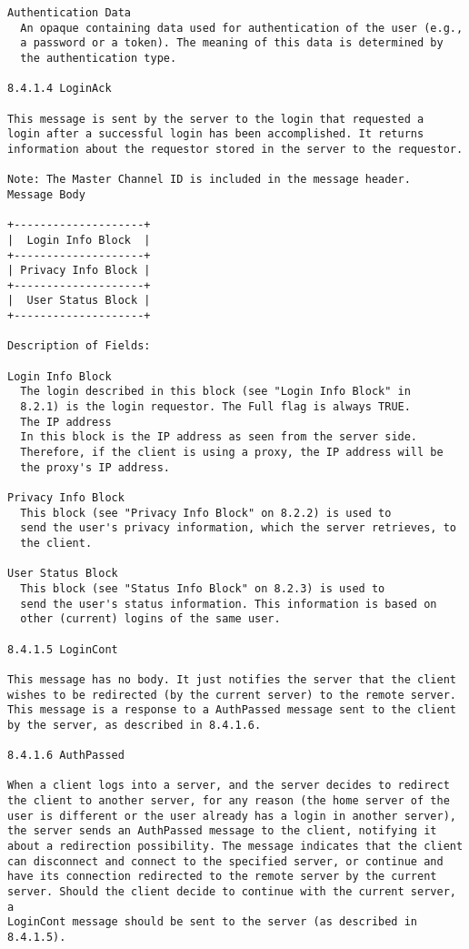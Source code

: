 \documentclass[titlepage,oneside]{book}
\begin{document}
\begin{verbatim}
Authentication Data
  An opaque containing data used for authentication of the user (e.g.,
  a password or a token). The meaning of this data is determined by
  the authentication type.

8.4.1.4 LoginAck

This message is sent by the server to the login that requested a
login after a successful login has been accomplished. It returns
information about the requestor stored in the server to the requestor.

Note: The Master Channel ID is included in the message header.
Message Body

+--------------------+
|  Login Info Block  |
+--------------------+
| Privacy Info Block |
+--------------------+
|  User Status Block |
+--------------------+

Description of Fields:

Login Info Block
  The login described in this block (see "Login Info Block" in
  8.2.1) is the login requestor. The Full flag is always TRUE.
  The IP address
  In this block is the IP address as seen from the server side.
  Therefore, if the client is using a proxy, the IP address will be
  the proxy's IP address.

Privacy Info Block
  This block (see "Privacy Info Block" on 8.2.2) is used to
  send the user's privacy information, which the server retrieves, to
  the client.

User Status Block
  This block (see "Status Info Block" on 8.2.3) is used to
  send the user's status information. This information is based on
  other (current) logins of the same user.

8.4.1.5 LoginCont

This message has no body. It just notifies the server that the client
wishes to be redirected (by the current server) to the remote server.
This message is a response to a AuthPassed message sent to the client
by the server, as described in 8.4.1.6.

8.4.1.6 AuthPassed

When a client logs into a server, and the server decides to redirect
the client to another server, for any reason (the home server of the
user is different or the user already has a login in another server),
the server sends an AuthPassed message to the client, notifying it
about a redirection possibility. The message indicates that the client
can disconnect and connect to the specified server, or continue and
have its connection redirected to the remote server by the current
server. Should the client decide to continue with the current server, a
LoginCont message should be sent to the server (as described in
8.4.1.5).


\end{verbatim}
\end{document}
